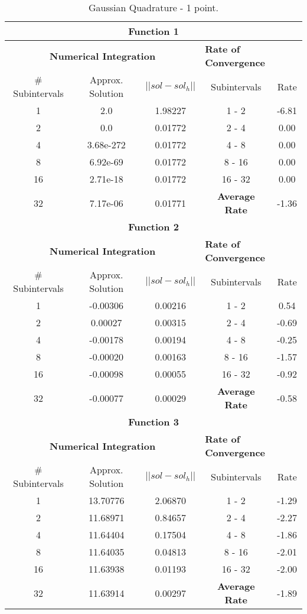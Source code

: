 \begin{table}[H]
    \centering
    \caption{Gaussian Quadrature - 1 point.}
    \begin{tabular}{ccccc}
    \hline
    \multicolumn{5}{c}{\textbf{Function 1}} \\
    \hline
    \multicolumn{3}{c}{\textbf{Numerical Integration}} & \multicolumn{2}{l}{\textbf{Rate of Convergence}} \\\hline
    \# Subintervals & Approx. Solution & $|| sol - sol_h ||$ & Subintervals & Rate \\\hline
    1 & 2.0 & 1.98227 & 1 - 2 &  -6.81\\
    2 & 0.0 & 0.01772 & 2 - 4 &  0.00\\
    4 & 3.68e-272 & 0.01772 & 4 - 8 &  0.00\\
    8 & 6.92e-69 & 0.01772 & 8 - 16 &  0.00\\
    16 & 2.71e-18 & 0.01772 & 16 - 32 &  0.00\\
    32 & 7.17e-06 & 0.01771 & \textbf{Average Rate} & -1.36\\ \hline
    \multicolumn{5}{c}{\textbf{Function 2}} \\
    \hline
    \multicolumn{3}{c}{\textbf{Numerical Integration}} & \multicolumn{2}{l}{\textbf{Rate of Convergence}} \\\hline
    \# Subintervals & Approx. Solution & $|| sol - sol_h ||$ & Subintervals & Rate \\\hline
    1 & -0.00306 & 0.00216 & 1 - 2 &  0.54\\
    2 & 0.00027& 0.00315 & 2 - 4 &  -0.69\\
    4 & -0.00178 & 0.00194 & 4 - 8 &  -0.25\\
    8 & -0.00020 & 0.00163 & 8 - 16 &  -1.57\\
    16 & -0.00098 & 0.00055 & 16 - 32 &  -0.92\\
    32 & -0.00077 & 0.00029 & \textbf{Average Rate} & -0.58\\ \hline
    \multicolumn{5}{c}{\textbf{Function 3}} \\
    \hline
    \multicolumn{3}{c}{\textbf{Numerical Integration}} & \multicolumn{2}{l}{\textbf{Rate of Convergence}} \\\hline
    \# Subintervals & Approx. Solution & $|| sol - sol_h ||$ & Subintervals & Rate \\\hline
    1 & 13.70776 & 2.06870 & 1 - 2 &  -1.29\\
    2 & 11.68971& 0.84657 & 2 - 4 &  -2.27\\
    4 & 11.64404 & 0.17504 & 4 - 8 &  -1.86\\
    8 & 11.64035 & 0.04813 & 8 - 16 &  -2.01\\
    16 & 11.63938 & 0.01193 & 16 - 32 &  -2.00\\
    32 & 11.63914& 0.00297 & \textbf{Average Rate} & -1.89\\ \hline
\end{tabular}
\end{table}

